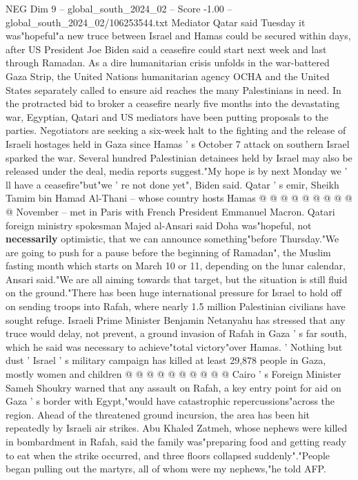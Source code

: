 \begin{textsample}{NEG Dim 9 – global\_south\_2024\_02 – Score -1.00 – global\_south\_2024\_02/106253544.txt}  \label{ex:f9_neg_360}
Mediator Qatar said Tuesday it was"hopeful"a new truce between Israel and Hamas could be secured within days, after US President Joe Biden said a ceasefire could start next week and last through Ramadan.
As a dire humanitarian crisis unfolds in the war-battered Gaza Strip, the United Nations humanitarian agency OCHA and the United States separately called to ensure aid reaches the many Palestinians in need.
In the protracted bid to broker a ceasefire nearly five months into the devastating war, Egyptian, Qatari and US mediators have been putting proposals to the parties.
Negotiators are seeking a six-week halt to the fighting and the release of Israeli hostages held in Gaza since Hamas ' s October 7 attack on southern Israel sparked the war.
Several hundred Palestinian detainees held by Israel may also be released under the deal, media reports suggest."My hope is by next Monday we ' ll have a ceasefire"but"we ' re not done yet", Biden said.
Qatar ' s emir, Sheikh Tamim bin Hamad Al-Thani -- whose country hosts Hamas @ @ @ @ @ @ @ @ @ @ November -- met in Paris with French President Emmanuel Macron.
Qatari foreign ministry spokesman Majed al-Ansari said Doha was"hopeful, not \textbf{necessarily} optimistic, that we can announce something"before Thursday."We are going to push for a pause before the beginning of Ramadan", the Muslim fasting month which starts on March 10 or 11, depending on the lunar calendar, Ansari said."We are all aiming towards that target, but the situation is still fluid on the ground."There has been huge international pressure for Israel to hold off on sending troops into Rafah, where nearly 1.5 million Palestinian civilians have sought refuge.
Israeli Prime Minister Benjamin Netanyahu has stressed that any truce would delay, not prevent, a ground invasion of Rafah in Gaza ' s far south, which he said was necessary to achieve"total victory"over Hamas. ' Nothing but dust ' Israel ' s military campaign has killed at least 29,878 people in Gaza, mostly women and children @ @ @ @ @ @ @ @ @ @ Cairo ' s Foreign Minister Sameh Shoukry warned that any assault on Rafah, a key entry point for aid on Gaza ' s border with Egypt,"would have catastrophic repercussions"across the region.
Ahead of the threatened ground incursion, the area has been hit repeatedly by Israeli air strikes.
Abu Khaled Zatmeh, whose nephews were killed in bombardment in Rafah, said the family was"preparing food and getting ready to eat when the strike occurred, and three floors collapsed suddenly"."People began pulling out the martyrs, all of whom were my nephews,"he told AFP.

\end{textsample}
